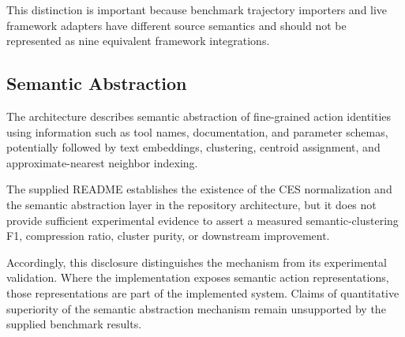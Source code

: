 \documentclass[11pt,a4paper]{article}
\begin{document}
This distinction is important because benchmark trajectory importers and live framework
adapters have different source semantics and should not be represented as nine equivalent
framework integrations.

\subsection{Semantic Abstraction}

The architecture describes semantic abstraction of fine-grained action identities using
information such as tool names, documentation, and parameter schemas, potentially
followed by text embeddings, clustering, centroid assignment, and approximate-nearest
neighbor indexing.

The supplied README establishes the existence of the CES normalization and the semantic
abstraction layer in the repository architecture, but it does not provide sufficient
experimental evidence to assert a measured semantic-clustering F1, compression ratio,
cluster purity, or downstream improvement.

Accordingly, this disclosure distinguishes the mechanism from its experimental validation.
Where the implementation exposes semantic action representations, those representations
are part of the implemented system. Claims of quantitative superiority of the semantic
abstraction mechanism remain unsupported by the supplied benchmark results.
\end{document}
